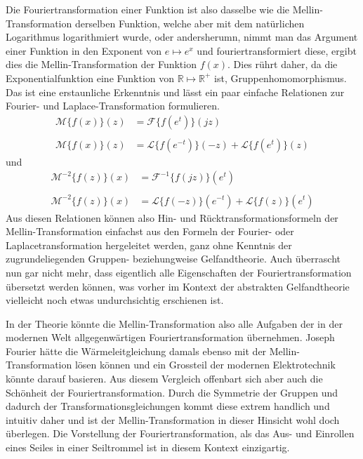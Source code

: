 Die Fouriertransformation einer Funktion ist also dasselbe wie die Mellin-Transformation derselben Funktion, welche aber
mit dem natürlichen Logarithmus logarithmiert wurde, oder andersherumn, nimmt man das Argument einer Funktion 
in den Exponent von $e \mapsto e^x$ und fouriertransformiert diese, ergibt dies die Mellin-Transformation der Funktion $f(x)$.
Dies rührt daher, da die Exponentialfunktion eine Funktion von $\mathbb{R} \mapsto \mathbb{R^+}$ ist, 
Gruppenhomomorphismus.
Das ist eine erstaunliche Erkenntnis und lässt ein paar einfache Relationen zur Fourier- und Laplace-Transformation 
formulieren.
\begin{align*}
    \mathcal{M}\{f(x)\}(z) &= \mathcal{F}\{f (e^{t})\}(jz) \\ \\
    \mathcal{M}\{f(x)\}(z) &= \mathcal{L}\{f (e^{-t})\}(-z) + \mathcal{L}\{f (e^{t})\}(z) 
\end{align*}
und
\begin{align*}
    \mathcal{M^{-2}}\{f(z)\}(x) &= \mathcal{F^{-1}}\{f (jz)\}(e^t) \\ \\
    \mathcal{M^{-2}}\{f(z)\}(x) &= \mathcal{L}\{f (-z)\}(e^{-t}) + \mathcal{L}\{f (z)\}(e^{t}) 
\end{align*}
Aus diesen Relationen können also Hin- und Rücktransformationsformeln der Mellin-Transformation einfachst aus den Formeln der 
Fourier- oder Laplacetransformation hergeleitet werden, ganz ohne Kenntnis der zugrundeliegenden Gruppen- 
beziehungweise Gelfandtheorie.
Auch überrascht nun gar nicht mehr, dass eigentlich alle Eigenschaften der Fouriertransformation übersetzt werden können, 
was vorher im Kontext der abstrakten Gelfandtheorie vielleicht noch etwas undurchsichtig erschienen ist.

In der Theorie könnte die Mellin-Transformation also alle Aufgaben der in der modernen Welt allgegenwärtigen Fouriertransformation 
übernehmen. 
Joseph Fourier hätte die Wärmeleitgleichung damals ebenso mit der Mellin-Transformation lösen können und ein Grossteil der modernen 
Elektrotechnik könnte darauf basieren. 
Aus diesem Vergleich offenbart sich aber auch die Schönheit der Fouriertransformation. 
Durch die Symmetrie der Gruppen und dadurch der Transformationsgleichungen kommt diese extrem handlich und intuitiv daher und ist der 
Mellin-Transformation in dieser Hinsicht wohl doch überlegen.
Die Vorstellung der Fouriertransformation, als das Aus- und Einrollen eines Seiles in einer Seiltrommel ist in diesem Kontext einzigartig.



